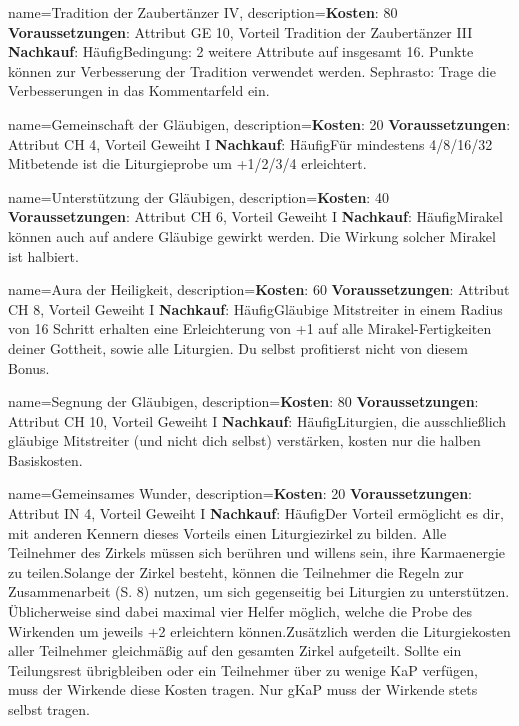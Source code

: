 {
    name={Tradition der Zaubertänzer IV},
    description={\textbf{Kosten}: 80 \textbf{Voraussetzungen}: Attribut GE 10, Vorteil Tradition der Zaubertänzer III \textbf{Nachkauf}: Häufig\newline Bedingung: 2 weitere Attribute auf insgesamt 16. Punkte können zur Verbesserung der Tradition verwendet werden. Sephrasto: Trage die Verbesserungen in das Kommentarfeld ein.}
}


{
    name={Gemeinschaft der Gläubigen},
    description={\textbf{Kosten}: 20 \textbf{Voraussetzungen}: Attribut CH 4, Vorteil Geweiht I \textbf{Nachkauf}: Häufig\newline Für mindestens 4/8/16/32 Mitbetende ist die Liturgieprobe um +1/2/3/4 erleichtert.}
}


{
    name={Unterstützung der Gläubigen},
    description={\textbf{Kosten}: 40 \textbf{Voraussetzungen}: Attribut CH 6, Vorteil Geweiht I \textbf{Nachkauf}: Häufig\newline Mirakel können auch auf andere Gläubige gewirkt werden. Die Wirkung solcher Mirakel ist halbiert.}
}


{
    name={Aura der Heiligkeit},
    description={\textbf{Kosten}: 60 \textbf{Voraussetzungen}: Attribut CH 8, Vorteil Geweiht I \textbf{Nachkauf}: Häufig\newline Gläubige Mitstreiter in einem Radius von 16 Schritt erhalten eine Erleichterung von +1 auf alle Mirakel-Fertigkeiten deiner Gottheit, sowie alle Liturgien. Du selbst profitierst nicht von diesem Bonus.}
}


{
    name={Segnung der Gläubigen},
    description={\textbf{Kosten}: 80 \textbf{Voraussetzungen}: Attribut CH 10, Vorteil Geweiht I \textbf{Nachkauf}: Häufig\newline Liturgien, die ausschließlich gläubige Mitstreiter (und nicht dich selbst) verstärken, kosten nur die halben Basiskosten.}
}


{
    name={Gemeinsames Wunder},
    description={\textbf{Kosten}: 20 \textbf{Voraussetzungen}: Attribut IN 4, Vorteil Geweiht I \textbf{Nachkauf}: Häufig\newline Der Vorteil ermöglicht es dir, mit anderen Kennern dieses Vorteils einen Liturgiezirkel zu bilden. Alle Teilnehmer des Zirkels müssen sich berühren und willens sein, ihre Karmaenergie zu teilen.\newline Solange der Zirkel besteht, können die Teilnehmer die Regeln zur Zusammenarbeit (S. 8) nutzen, um sich gegenseitig bei Liturgien zu unterstützen. Üblicherweise sind dabei maximal vier Helfer möglich, welche die Probe des Wirkenden um jeweils +2 erleichtern können.\newline Zusätzlich werden die Liturgiekosten aller Teilnehmer gleichmäßig auf den gesamten Zirkel aufgeteilt. Sollte ein Teilungsrest übrigbleiben oder ein Teilnehmer über zu wenige KaP verfügen, muss der Wirkende diese Kosten tragen. Nur gKaP muss der Wirkende stets selbst tragen.}
}


